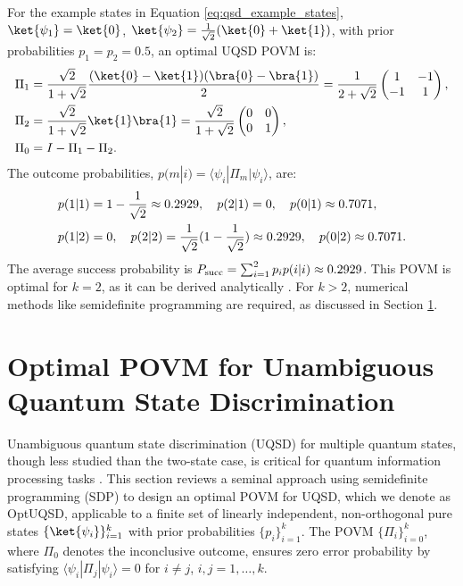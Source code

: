 For the example states in Equation \ref{eq:qsd_example_states},
\(\ket{\psi_1} = \ket{0}\), \(\ket{\psi_2} = \frac{1}{\sqrt{2}} (\ket{0} + \ket{1})\),
with prior probabilities \(p_1 = p_2 = 0.5\), an optimal UQSD POVM is:
\begin{align}
    \Pi_1 & = \frac{\sqrt{2}}{1 + \sqrt{2}} \frac{(\ket{0} - \ket{1})(\bra{0} - \bra{1})}{2} = \frac{1}{2 + \sqrt{2}} \begin{pmatrix} 1 & -1 \\ -1 & 1 \end{pmatrix}, \label{eq:uqsd_pi1} \\
    \Pi_2 & = \frac{\sqrt{2}}{1 + \sqrt{2}} \ket{1}\bra{1} = \frac{\sqrt{2}}{1 + \sqrt{2}} \begin{pmatrix} 0 & 0 \\ 0 & 1 \end{pmatrix}, \label{eq:uqsd_pi2}                              \\
    \Pi_0 & = I - \Pi_1 - \Pi_2. \label{eq:uqsd_pi0}
\end{align}
The outcome probabilities, \( p(m|i) = \langle \psi_i | \Pi_m | \psi_i \rangle \), are:
\begin{align}
    p(1|1) & = 1 - \frac{1}{\sqrt{2}} \approx 0.2929, \quad p(2|1) = 0, \quad p(0|1) \approx 0.7071, \notag                      \\
    p(1|2) & = 0, \quad p(2|2) = \frac{1}{\sqrt{2}} (1 - \frac{1}{\sqrt{2}}) \approx 0.2929, \quad p(0|2) \approx 0.7071. \notag
\end{align}
The average success probability is \( P_{\mathrm{succ}} = \sum_{i=1}^2 p_i p(i|i) \approx 0.2929 \).
This POVM is optimal for \( k = 2 \), as it can be derived analytically \cite{RN493}.
For \( k > 2 \), numerical methods like semidefinite programming are required,
as discussed in Section \ref{sec:optimal_povm_for_uqsd}.

\section{Optimal POVM for Unambiguous Quantum State Discrimination}
\label{sec:optimal_povm_for_uqsd}

Unambiguous quantum state discrimination (UQSD) for multiple quantum states,
though less studied than the two-state case, is critical for quantum
information processing tasks \cite{RN23}.
This section reviews a seminal approach using semidefinite programming (SDP)
to design an optimal POVM for UQSD, which we denote as OptUQSD, applicable to
a finite set of linearly independent, non-orthogonal pure states
\(\{ \ket{\psi_i} \}_{i=1}^k\) with
prior probabilities \(\{ p_i \}_{i=1}^k\). The POVM \(\{ \Pi_i \}_{i=0}^k\),
where \(\Pi_0\) denotes the inconclusive outcome, ensures zero error
probability by satisfying \(\langle \psi_i | \Pi_j | \psi_i \rangle = 0\) for
\(i \neq j\), \(i, j = 1, \ldots, k\).

